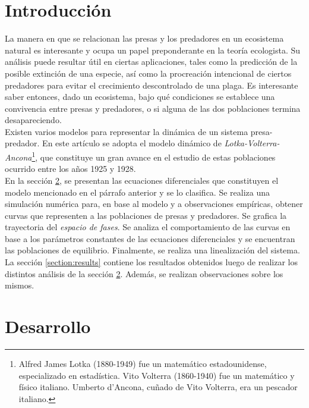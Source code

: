 \documentclass[journal, monochrome]{IEEEtran}
\begin{document}
\section{Introducción}

La manera en que se relacionan las presas y los predadores en un ecosistema natural
es interesante y ocupa un papel preponderante en la teoría ecologista. Su
análisis puede resultar útil en ciertas aplicaciones, tales como la predicción
de la posible extinción de una especie, así como la procreación intencional de
ciertos predadores para evitar el crecimiento descontrolado de una plaga. Es interesante saber entonces, dado un ecosistema, bajo qué condiciones
se establece una convivencia entre presas y predadores, o si alguna de las
dos poblaciones termina desapareciendo.\\

Existen varios modelos para representar la dinámica de un sistema presa-predador.
En este artículo se adopta el modelo dinámico de \textit{Lotka-Volterra-Ancona}\footnote{Alfred James Lotka (1880-1949) fue un matemático estadounidense, especializado en estadística. 
Vito Volterra (1860-1940) fue un matemático y físico italiano. Umberto d’Ancona, cuñado de Vito Volterra, era un pescador italiano.},
que constituye un gran avance en el estudio de estas poblaciones ocurrido entre los años
1925 y 1928.\\

En la sección \ref{section:development}, se presentan las ecuaciones diferenciales
que constituyen el modelo mencionado en el párrafo anterior y se lo clasifica. Se realiza una simulación numérica para, en base al modelo y a observaciones empíricas, obtener curvas que 
representen a las poblaciones de presas y predadores. Se grafica la trayectoria del \textit{espacio de fases}. Se analiza el comportamiento de las curvas en base a los parámetros constantes 
de las ecuaciones diferenciales y se encuentran las poblaciones de equilibrio. Finalmente, se realiza una linealización del sistema.\\

La sección \ref{section:results} contiene los resultados obtenidos luego de realizar los distintos análisis de la sección \ref{section:development}. Además, se realizan observaciones sobre los mismos.\\

\section{Desarrollo}
\label{section:development}
\end{document}
